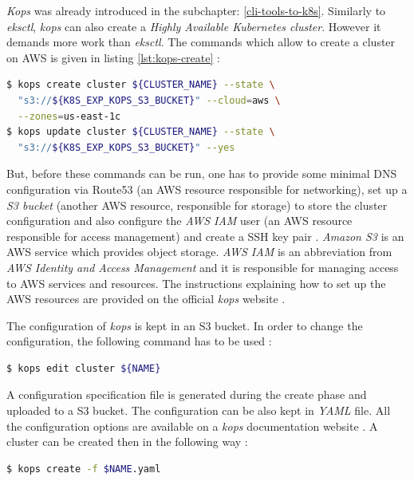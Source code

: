 \textit{Kops} was already introduced in the subchapter: \ref{cli-tools-to-k8s}. Similarly to \textit{eksctl}, \textit{kops} can also create a \textit{Highly Available Kubernetes cluster}. However it demands more work than \textit{eksctl}. The commands which allow to create a cluster on AWS is given in listing \ref{lst:kops-create} \cite{book-mastering-k8s}:
\begin{lstlisting}[basicstyle=\small,caption={The commands of \textit{kops} CLI tool used to create a Kubernetes cluster configuration and then to deploy the cluster},captionpos=b,language=Bash,xleftmargin=1cm,label=lst:kops-create]
$ kops create cluster ${CLUSTER_NAME} --state \
  "s3://${K8S_EXP_KOPS_S3_BUCKET}" --cloud=aws \
  --zones=us-east-1c
$ kops update cluster ${CLUSTER_NAME} --state \
  "s3://${K8S_EXP_KOPS_S3_BUCKET}" --yes
\end{lstlisting}
But, before these commands can be run, one has to provide some minimal DNS configuration via Route53 (an AWS resource responsible for networking), set up a \textit{S3 bucket} (another AWS resource, responsible for storage) to store the cluster configuration \cite{book-mastering-k8s} and also configure the \textit{AWS IAM} user (an AWS resource responsible for access management) and create a SSH key pair \cite{online-kops-aws}. \textit{Amazon S3} is an AWS service which provides object storage.  \textit{AWS IAM} is an abbreviation from \textit{AWS Identity and Access Management} and it is responsible for managing access to AWS services and resources. The instructions explaining how to set up the AWS resources are provided on the official \textit{kops} website \cite{online-kops-aws}.

The configuration of \textit{kops} is kept in an S3 bucket. In order to change the configuration, the following command has to be used \cite{online-kops-aws}:
\begin{lstlisting}[basicstyle=\small,caption={A command of \textit{kops} CLI tool used to edit a Kubernetes cluster~configuration},captionpos=b,language=Bash,xleftmargin=1cm]
$ kops edit cluster ${NAME}
\end{lstlisting}

A configuration specification file is generated during the create phase and uploaded to a S3 bucket. The configuration can be also kept in \textit{YAML} file. All the configuration options are available on a \textit{kops} documentation website \cite{online-kops-yaml-config-golang}. A cluster can be created then in the following way \cite{online-kops-yaml-config}:
\begin{lstlisting}[basicstyle=\small,caption={A command of \textit{kops} CLI tool used to create a Kubernetes cluster using a \textit{YAML} configuration file},captionpos=b,language=Bash,xleftmargin=1cm]
$ kops create -f $NAME.yaml
\end{lstlisting}


